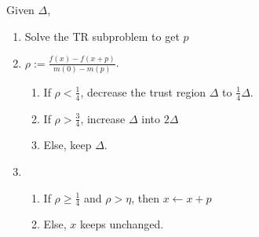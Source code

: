 Given $\Delta$,
\begin{enumerate}
\item
Solve the TR subproblem to get $p$
\item
$\rho:=\frac{f(x) - f(x+p)}{m(0) - m(p)}$. 
\begin{enumerate}
\item
If $\rho<\frac{1}{4}$, decrease the trust region $\Delta$ to $\frac{1}{4}\Delta$.
\item
If $\rho>\frac{3}{4}$, increase $\Delta$ into $2\Delta$
\item
Else, keep $\Delta$.
\end{enumerate}
\item
\begin{enumerate}
\item
If $\rho\ge\frac{1}{4}$ and $\rho>\eta$, then $x\leftarrow x+p$
\item
Else, $x$ keeps unchanged.
\end{enumerate}
\end{enumerate}












